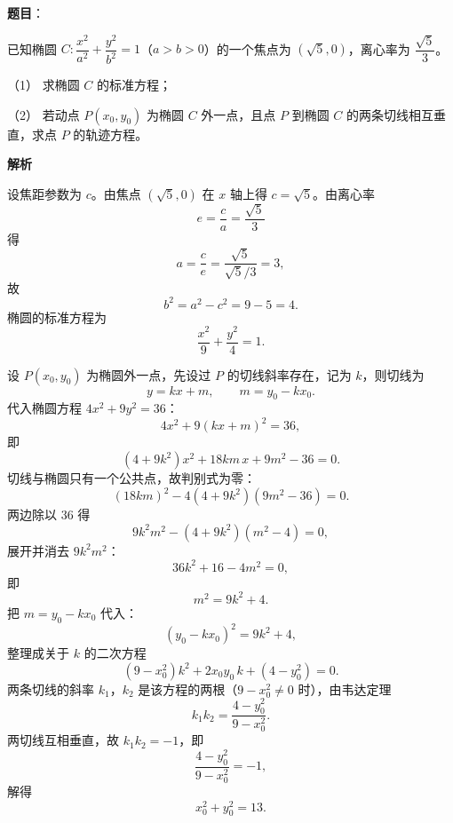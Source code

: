\begin{answer}



\end{answer}
\begin{answer}

\textbf{题目}：

已知椭圆 $C:\dfrac{x^2}{a^2}+\dfrac{y^2}{b^2}=1$（$a>b>0$）的一个焦点为 $(\sqrt5,0)$，离心率为 $\dfrac{\sqrt5}{3}$。

（1） 求椭圆 $C$ 的标准方程；

（2） 若动点 $P(x_0,y_0)$ 为椭圆 $C$ 外一点，且点 $P$ 到椭圆 $C$ 的两条切线相互垂直，求点 $P$ 的轨迹方程。

\textbf{解析}


设焦距参数为 $c$。由焦点 $(\sqrt5,0)$ 在 $x$ 轴上得 $c=\sqrt5$。由离心率
\nopagebreak[4]
\[e=\frac ca=\frac{\sqrt5}{3}\]
得
\nopagebreak[4]
\[a=\frac{c}{e}=\frac{\sqrt5}{\sqrt5/3}=3,\]
故
\nopagebreak[4]
\[b^2=a^2-c^2=9-5=4 .\]
椭圆的标准方程为
\nopagebreak[4]
\[\frac{x^2}{9}+\frac{y^2}{4}=1 .\]


设 $P(x_0,y_0)$ 为椭圆外一点，先设过 $P$ 的切线斜率存在，记为 $k$，则切线为
\nopagebreak[4]
\[y=kx+m,\qquad m=y_0-kx_0 .\]
代入椭圆方程 $4x^2+9y^2=36$：
\nopagebreak[4]
\[4x^2+9(kx+m)^2=36,\]
即
\nopagebreak[4]
\[(4+9k^2)x^2+18km\,x+9m^2-36=0 .\]
切线与椭圆只有一个公共点，故判别式为零：
\nopagebreak[4]
\[(18km)^2-4(4+9k^2)(9m^2-36)=0 .\]
两边除以 $36$ 得
\nopagebreak[4]
\[9k^2m^2-(4+9k^2)(m^2-4)=0,\]
展开并消去 $9k^2m^2$：
\nopagebreak[4]
\[36k^2+16-4m^2=0,\]
即
\nopagebreak[4]
\[m^2=9k^2+4 .\]
把 $m=y_0-kx_0$ 代入：
\nopagebreak[4]
\[(y_0-kx_0)^2=9k^2+4,\]
整理成关于 $k$ 的二次方程
\nopagebreak[4]
\[(9-x_0^2)k^2+2x_0y_0\,k+(4-y_0^2)=0 .\]
两条切线的斜率 $k_1$，$k_2$ 是该方程的两根（$9-x_0^2\neq0$ 时），由韦达定理
\nopagebreak[4]
\[k_1k_2=\frac{4-y_0^2}{9-x_0^2} .\]
两切线互相垂直，故 $k_1k_2=-1$，即
\nopagebreak[4]
\[\frac{4-y_0^2}{9-x_0^2}=-1,\]
解得
\nopagebreak[4]
\[x_0^2+y_0^2=13 .\]


\end{answer}
